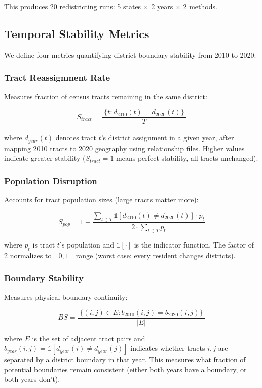 This produces 20 redistricting runs: 5 states $\times$ 2 years $\times$ 2 methods.

\subsection{Temporal Stability Metrics}

We define four metrics quantifying district boundary stability from 2010 to 2020:

\subsubsection{Tract Reassignment Rate}

Measures fraction of census tracts remaining in the same district:

$$S_{tract} = \frac{|\{t : d_{2010}(t) = d_{2020}(t)\}|}{|T|}$$

where $d_{year}(t)$ denotes tract $t$'s district assignment in a given year, after mapping 2010 tracts to 2020 geography using relationship files. Higher values indicate greater stability ($S_{tract} = 1$ means perfect stability, all tracts unchanged).

\subsubsection{Population Disruption}

Accounts for tract population sizes (large tracts matter more):

$$S_{pop} = 1 - \frac{\sum_{t \in T} \mathbb{1}[d_{2010}(t) \neq d_{2020}(t)] \cdot p_t}{2 \cdot \sum_{t \in T} p_t}$$

where $p_t$ is tract $t$'s population and $\mathbb{1}[\cdot]$ is the indicator function. The factor of 2 normalizes to $[0,1]$ range (worst case: every resident changes districts).

\subsubsection{Boundary Stability}

Measures physical boundary continuity:

$$BS = \frac{|\{(i,j) \in E : b_{2010}(i,j) = b_{2020}(i,j)\}|}{|E|}$$

where $E$ is the set of adjacent tract pairs and $b_{year}(i,j) = \mathbb{1}[d_{year}(i) \neq d_{year}(j)]$ indicates whether tracts $i,j$ are separated by a district boundary in that year. This measures what fraction of potential boundaries remain consistent (either both years have a boundary, or both years don't).

